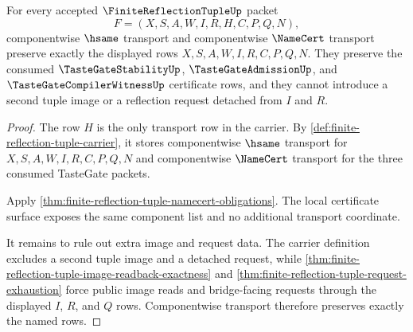 \begin{theorem}
\label{thm:finite-reflection-tuple-componentwise-transport}
For every accepted $\FiniteReflectionTupleUp$ packet
$$
F=(X,S,A,W,I,R,H,C,P,Q,N),
$$
componentwise $\hsame$ transport and componentwise $\NameCert$ transport preserve exactly the displayed rows $X,S,A,W,I,R,C,P,Q,N$. They preserve the consumed $\TasteGateStabilityUp$, $\TasteGateAdmissionUp$, and $\TasteGateCompilerWitnessUp$ certificate rows, and they cannot introduce a second tuple image or a reflection request detached from $I$ and $R$.
\end{theorem}
\begin{proof}
The row $H$ is the only transport row in the carrier. By \autoref{def:finite-reflection-tuple-carrier}, it stores componentwise $\hsame$ transport for $X,S,A,W,I,R,C,P,Q,N$ and componentwise $\NameCert$ transport for the three consumed TasteGate packets.

Apply \autoref{thm:finite-reflection-tuple-namecert-obligations}. The local certificate surface exposes the same component list and no additional transport coordinate.

It remains to rule out extra image and request data. The carrier definition excludes a second tuple image and a detached request, while \autoref{thm:finite-reflection-tuple-image-readback-exactness} and \autoref{thm:finite-reflection-tuple-request-exhaustion} force public image reads and bridge-facing requests through the displayed $I$, $R$, and $Q$ rows. Componentwise transport therefore preserves exactly the named rows.
\end{proof}

